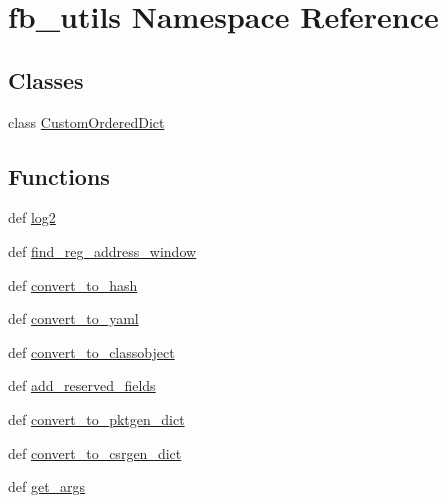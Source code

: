 \hypertarget{namespacefb__utils}{\section{fb\-\_\-utils Namespace Reference}
\label{namespacefb__utils}
}
\subsection*{Classes}
\begin{DoxyCompactItemize}
\item 
class \hyperlink{classfb__utils_1_1CustomOrderedDict}{Custom\-Ordered\-Dict}
\end{DoxyCompactItemize}
\subsection*{Functions}
\begin{DoxyCompactItemize}
\item 
def \hyperlink{namespacefb__utils_aeb203efaeb5fcaff5ab95bee3fef33ca}{log2}
\item 
def \hyperlink{namespacefb__utils_a2545725f24c3aaa92642a0081cd226d4}{find\-\_\-reg\-\_\-address\-\_\-window}
\item 
def \hyperlink{namespacefb__utils_ae6e322979689e4108390d0a6fb5dc055}{convert\-\_\-to\-\_\-hash}
\item 
def \hyperlink{namespacefb__utils_a393ba7ef30ea3262fa851a3a708e6d4f}{convert\-\_\-to\-\_\-yaml}
\item 
def \hyperlink{namespacefb__utils_a04913a118fa7f2cb75ad69b36fde1b72}{convert\-\_\-to\-\_\-classobject}
\item 
def \hyperlink{namespacefb__utils_ae34cab4a7ade9539872b87d591b6b002}{add\-\_\-reserved\-\_\-fields}
\item 
def \hyperlink{namespacefb__utils_afb09bda82c3d6df6467ce43c4566bc9e}{convert\-\_\-to\-\_\-pktgen\-\_\-dict}
\item 
def \hyperlink{namespacefb__utils_abf8fd295a6dba986029547c0b9ce9211}{convert\-\_\-to\-\_\-csrgen\-\_\-dict}
\item 
def \hyperlink{namespacefb__utils_a2bd37605308dd90c42b4388604e79d78}{get\-\_\-args}
\end{DoxyCompactItemize}
